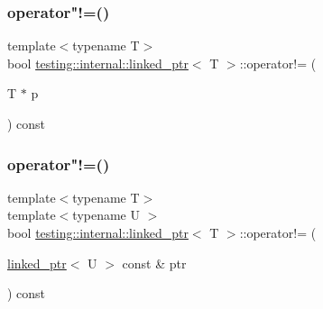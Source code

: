 \subsubsection{\texorpdfstring{operator"!=()}{operator!=()}\hspace{0.1cm}{\footnotesize\ttfamily [1/2]}}
{\footnotesize\ttfamily template$<$typename T$>$ \\
bool \mbox{\hyperlink{classtesting_1_1internal_1_1linked__ptr}{testing\+::internal\+::linked\+\_\+ptr}}$<$ T $>$\+::operator!= (\begin{DoxyParamCaption}\item[{T $\ast$}]{p }\end{DoxyParamCaption}) const\hspace{0.3cm}{\ttfamily [inline]}}

\mbox{\label{classtesting_1_1internal_1_1linked__ptr_a4801114a83a9e12b08f90e0d28318f26}} 
\subsubsection{\texorpdfstring{operator"!=()}{operator!=()}\hspace{0.1cm}{\footnotesize\ttfamily [2/2]}}
{\footnotesize\ttfamily template$<$typename T$>$ \\
template$<$typename U $>$ \\
bool \mbox{\hyperlink{classtesting_1_1internal_1_1linked__ptr}{testing\+::internal\+::linked\+\_\+ptr}}$<$ T $>$\+::operator!= (\begin{DoxyParamCaption}\item[{\mbox{\hyperlink{classtesting_1_1internal_1_1linked__ptr}{linked\+\_\+ptr}}$<$ U $>$ const \&}]{ptr }\end{DoxyParamCaption}) const\hspace{0.3cm}{\ttfamily [inline]}}

\mbox{\label{classtesting_1_1internal_1_1linked__ptr_a23ff85ac97eed03e945034b65c8eb900}} 
